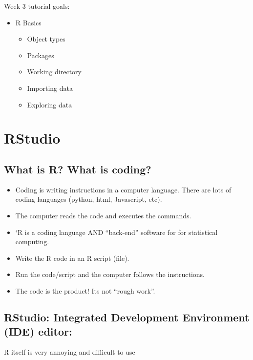 \documentclass[
]{book}
\providecommand{\tightlist}{%
  \setlength{\itemsep}{0pt}\setlength{\parskip}{0pt}}
\begin{document}
Week 3 tutorial goals:

\begin{itemize}
\tightlist
\item
  R Basics

  \begin{itemize}
  \tightlist
  \item
    Object types
  \item
    Packages
  \item
    Working directory
  \item
    Importing data
  \item
    Exploring data
  \end{itemize}
\end{itemize}

\section{RStudio}\label{rstudio}

\subsection*{What is R? What is coding?}\label{what-is-r-what-is-coding}

\begin{itemize}
\item
  Coding is writing instructions in a computer language. There are lots of coding languages (python, html, Javascript, etc).
\item
  The computer reads the code and executes the commands.
\item
  `R is a coding language AND ``back-end'' software for for statistical computing.
\item
  Write the R code in an R script (file).
\item
  Run the code/script and the computer follows the instructions.
\item
  The code is the product! Its not ``rough work''.
\end{itemize}

\subsection{RStudio: Integrated Development Environment (IDE) editor:}\label{rstudio-integrated-development-environment-ide-editor}

R itself is very annoying and difficult to use
\end{document}
